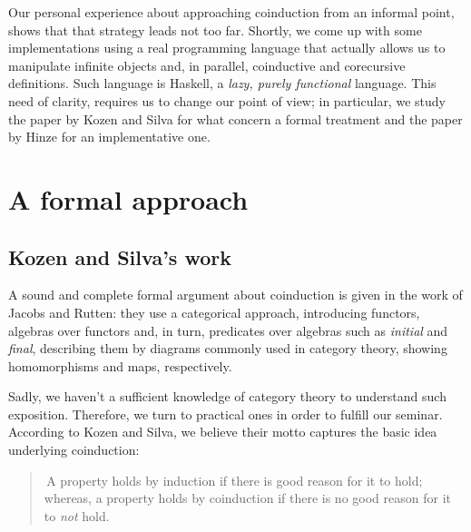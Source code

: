Our personal experience about approaching coinduction from an informal
point, shows that that strategy leads not too far. 
Shortly, we come up with some implementations
using a real programming language that actually allows us to manipulate
infinite objects and, in parallel, coinductive and corecursive definitions. 
Such language is Haskell, a \emph{lazy, purely functional} language.  
This need of clarity, requires us to change our point of view;
in particular, we study the paper by Kozen and Silva for what concern
a formal treatment and the paper by Hinze for an implementative one.

\section{A formal approach}

\subsection{Kozen and Silva's work}

A sound and complete formal argument about coinduction is given in the
work of Jacobs and Rutten: they use a categorical approach, introducing
functors, algebras over functors and, in turn, predicates over algebras 
such as \emph{initial} and \emph{final}, describing them by diagrams 
commonly used in category theory, showing homomorphisms and maps, 
respectively.

Sadly, we haven't a sufficient knowledge of category theory to understand
such exposition. Therefore, we turn to practical ones in order to fulfill
our seminar. According to Kozen and Silva, we believe their motto captures
the basic idea underlying coinduction:
\begin{quote}
    \guillemotleft\,A property holds by induction if there is good reason for
    it to hold; whereas, a property holds by coinduction if there is no good
    reason for it to \emph{not} hold.\guillemotright
\end{quote}


